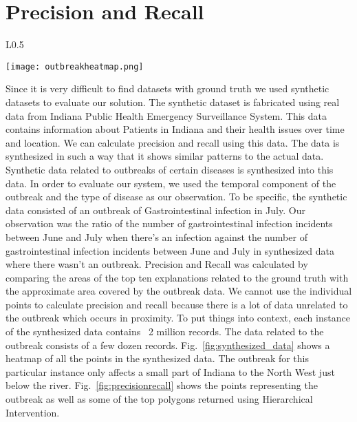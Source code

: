 \section{Precision and Recall}
\begin{wrapfigure}{L}{0.5\textwidth}
  \begin{center}
    \texttt{[image: outbreakheatmap.png]}
  \end{center}
  \caption{A heatmap showing sythesized data}
  \label{fig:synthesized_data}
\end{wrapfigure}

Since it is very difficult to find datasets with ground truth we used synthetic datasets to evaluate our solution\citep{maciejewski2009generating}. The synthetic dataset is fabricated using real data from Indiana Public Health Emergency Surveillance System. This data contains information about Patients in Indiana and their health issues over time and location. We can calculate precision and recall using this data\citep{powers2011evaluation}. The data is synthesized in such a way that it shows similar patterns to the actual data. Synthetic data related to outbreaks of certain diseases is synthesized into this data. In order to evaluate our system, we used the temporal component of the outbreak and the type of disease as our observation. To be specific, the synthetic data consisted of an outbreak of Gastrointestinal infection in July. Our observation was the ratio of the number of gastrointestinal infection incidents between June and July when there's an infection against the number of gastrointestinal infection incidents between June and July in synthesized data where there wasn't an outbreak. Precision and Recall was calculated by comparing the areas of the top ten explanations related to the ground truth with the approximate area covered by the outbreak data. We cannot use the individual points to calculate precision and recall because there is a lot of data unrelated to the outbreak which occurs in proximity. To put things into context, each instance of the synthesized data contains ~2 million records. The data related to the outbreak consists of a few dozen records. Fig.~\ref{fig:synthesized_data} shows a heatmap of all the points in the synthesized data. The outbreak for this particular instance only affects a small part of Indiana to the North West just below the river. Fig.~\ref{fig:precisionrecall} shows the points representing the outbreak as well as some of the top polygons returned using Hierarchical Intervention.

